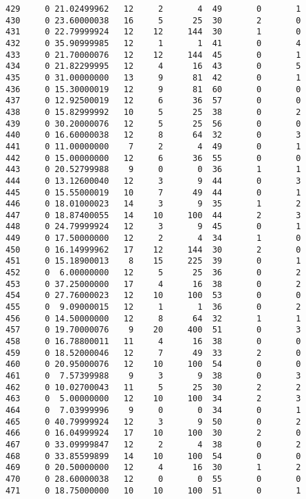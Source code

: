 \documentclass[
  letterpaper,
  DIV=11,
  numbers=noendperiod]{scrreprt}
\begin{document}
\begin{verbatim}
429     0 21.02499962   12     2       4  49       0       1
430     0 23.60000038   16     5      25  30       2       0
431     0 22.79999924   12    12     144  30       1       0
432     0 35.90999985   12     1       1  41       0       4
433     0 21.70000076   12    12     144  45       0       1
434     0 21.82299995   12     4      16  43       0       5
435     0 31.00000000   13     9      81  42       0       1
436     0 15.30000019   12     9      81  60       0       0
437     0 12.92500019   12     6      36  57       0       0
438     0 15.82999992   10     5      25  38       0       2
439     0 30.20000076   12     5      25  56       0       0
440     0 16.60000038   12     8      64  32       0       3
441     0 11.00000000    7     2       4  49       0       1
442     0 15.00000000   12     6      36  55       0       0
443     0 20.52799988    9     0       0  36       1       1
444     0 13.12600040   12     3       9  44       0       3
445     0 15.55000019   10     7      49  44       0       1
446     0 18.01000023   14     3       9  35       1       2
447     0 18.87400055   14    10     100  44       2       3
448     0 24.79999924   12     3       9  45       0       1
449     0 17.50000000   12     2       4  34       1       0
450     0 16.14999962   17    12     144  30       2       0
451     0 15.18900013    8    15     225  39       0       1
452     0  6.00000000   12     5      25  36       0       2
453     0 37.25000000   17     4      16  38       0       2
454     0 27.76000023   12    10     100  53       0       0
455     0  9.09000015   12     1       1  36       0       2
456     0 14.50000000   12     8      64  32       1       1
457     0 19.70000076    9    20     400  51       0       3
458     0 16.78800011   11     4      16  38       0       0
459     0 18.52000046   12     7      49  33       2       0
460     0 20.95000076   12    10     100  54       0       0
461     0  7.57399988    9     3       9  38       0       3
462     0 10.02700043   11     5      25  30       2       2
463     0  5.00000000   12    10     100  34       2       3
464     0  7.03999996    9     0       0  34       0       1
465     0 40.79999924   12     3       9  50       0       2
466     0 16.04999924   17    10     100  30       2       0
467     0 33.09999847   12     2       4  38       0       2
468     0 33.85599899   14    10     100  54       0       0
469     0 20.50000000   12     4      16  30       1       2
470     0 28.60000038   12     0       0  55       0       0
471     0 18.75000000   10    10     100  51       0       1

\end{verbatim}
\end{document}
